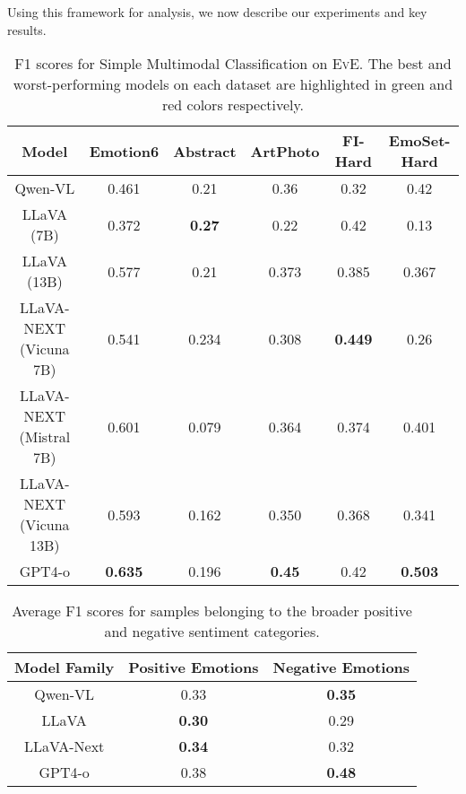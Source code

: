 Using this framework for analysis, we now describe our experiments and key results.

\begin{table*}[t]
\small
    \centering
    \begin{tabular}{cccccc}
        \toprule
         Model & Emotion6 & Abstract & ArtPhoto & FI-Hard & EmoSet-Hard \\
         \midrule
         Qwen-VL & 0.461 & 0.21 & 0.36 & \colorbox{red!20}{0.32} & 0.42 \\
         \midrule
         LLaVA (7B) & \colorbox{red!20}{0.372} & \colorbox{green!20}{\textbf{0.27}} & \colorbox{red!20}{0.22} & 0.42 & \colorbox{red!20}{0.13} \\
         LLaVA (13B) & 0.577 & 0.21 & 0.373 & 0.385 & 0.367 \\
         \midrule
         LLaVA-NEXT (Vicuna 7B) & 0.541 & 0.234 & 0.308 & \colorbox{green!20}{\textbf{0.449}} & 0.26 \\
         LLaVA-NEXT (Mistral 7B) & 0.601 & \colorbox{red!40}{0.079} & 0.364 &  0.374 & 0.401 \\
         LLaVA-NEXT (Vicuna 13B) & 0.593 & 0.162 & 0.350 & 0.368 & 0.341 \\
         \midrule
         GPT4-o & \colorbox{green!40}{\textbf{0.635}} & 0.196 & \colorbox{green!20}{\textbf{0.45}} & 0.42 & \colorbox{green!20}{\textbf{0.503}} \\
         \midrule  
    \end{tabular}
    \caption{F1 scores for Simple Multimodal Classification on \textsc{EvE}. The best and worst-performing models on each dataset are highlighted in green and red colors respectively.}
    \label{tab:exp1_results}
\end{table*}

\begin{table}[t]
\small
    \centering
    \begin{tabular}{ccc}
    \toprule
         Model Family & Positive Emotions & Negative Emotions \\
         \midrule
         Qwen-VL & 0.33 & \textbf{0.35} \\
         LLaVA & \textbf{0.30} & 0.29 \\
         LLaVA-Next & \textbf{0.34} & 0.32 \\
         GPT4-o & 0.38 & \textbf{0.48} \\
         \bottomrule
    \end{tabular}
    \caption{Average F1 scores for samples belonging to the broader positive and negative sentiment categories.}
    \label{tab:sentiment_avg_f1}
\end{table}


